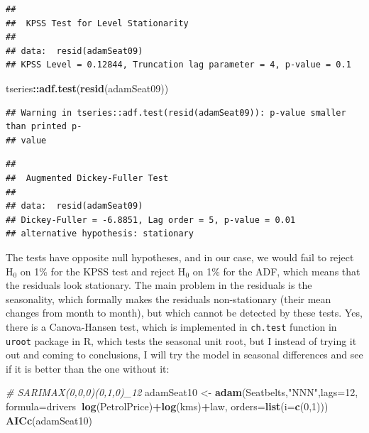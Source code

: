 \documentclass[]{book}
\newenvironment{Shaded}{\begin{snugshade}}{\end{snugshade}}
\newcommand{\CommentTok}[1]{\textcolor[rgb]{0.56,0.35,0.01}{\textit{#1}}}
\newcommand{\DataTypeTok}[1]{\textcolor[rgb]{0.13,0.29,0.53}{#1}}
\newcommand{\DecValTok}[1]{\textcolor[rgb]{0.00,0.00,0.81}{#1}}
\newcommand{\KeywordTok}[1]{\textcolor[rgb]{0.13,0.29,0.53}{\textbf{#1}}}
\newcommand{\NormalTok}[1]{#1}
\newcommand{\OperatorTok}[1]{\textcolor[rgb]{0.81,0.36,0.00}{\textbf{#1}}}
\newcommand{\StringTok}[1]{\textcolor[rgb]{0.31,0.60,0.02}{#1}}
\theoremstyle{definition}
\theoremstyle{definition}
\theoremstyle{definition}
\theoremstyle{definition}
\theoremstyle{remark}
\begin{document}
\begin{verbatim}
## 
##  KPSS Test for Level Stationarity
## 
## data:  resid(adamSeat09)
## KPSS Level = 0.12844, Truncation lag parameter = 4, p-value = 0.1
\end{verbatim}

\begin{Shaded}
\begin{Highlighting}[]
\NormalTok{tseries}\OperatorTok{::}\KeywordTok{adf.test}\NormalTok{(}\KeywordTok{resid}\NormalTok{(adamSeat09))}
\end{Highlighting}
\end{Shaded}

\begin{verbatim}
## Warning in tseries::adf.test(resid(adamSeat09)): p-value smaller than printed p-
## value
\end{verbatim}

\begin{verbatim}
## 
##  Augmented Dickey-Fuller Test
## 
## data:  resid(adamSeat09)
## Dickey-Fuller = -6.8851, Lag order = 5, p-value = 0.01
## alternative hypothesis: stationary
\end{verbatim}

The tests have opposite null hypotheses, and in our case, we would fail to reject H\(_0\) on 1\% for the KPSS test and reject H\(_0\) on 1\% for the ADF, which means that the residuals look stationary. The main problem in the residuals is the seasonality, which formally makes the residuals non-stationary (their mean changes from month to month), but which cannot be detected by these tests. Yes, there is a Canova-Hansen test, which is implemented in \texttt{ch.test} function in \texttt{uroot} package in R, which tests the seasonal unit root, but I instead of trying it out and coming to conclusions, I will try the model in seasonal differences and see if it is better than the one without it:

\begin{Shaded}
\begin{Highlighting}[]
\CommentTok{# SARIMAX(0,0,0)(0,1,0)_12}
\NormalTok{adamSeat10 <-}\StringTok{ }\KeywordTok{adam}\NormalTok{(Seatbelts,}\StringTok{"NNN"}\NormalTok{,}\DataTypeTok{lags=}\DecValTok{12}\NormalTok{,}
                   \DataTypeTok{formula=}\NormalTok{drivers}\OperatorTok{~}\KeywordTok{log}\NormalTok{(PetrolPrice)}\OperatorTok{+}\KeywordTok{log}\NormalTok{(kms)}\OperatorTok{+}\NormalTok{law,}
                   \DataTypeTok{orders=}\KeywordTok{list}\NormalTok{(}\DataTypeTok{i=}\KeywordTok{c}\NormalTok{(}\DecValTok{0}\NormalTok{,}\DecValTok{1}\NormalTok{)))}
\KeywordTok{AICc}\NormalTok{(adamSeat10)}
\end{Highlighting}
\end{Shaded}
\end{document}
